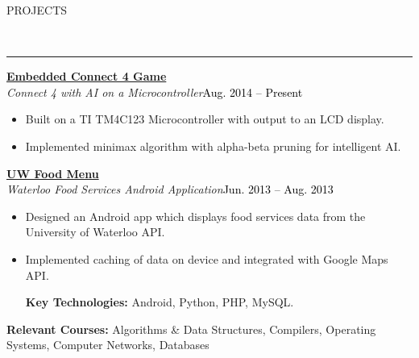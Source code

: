 \documentclass[11pt, letterpaper, oneside]{article}
\newcommand{\HRule}[2]{\textcolor{#1}{\rule{\linewidth}{#2}}}
\newcommand{\sectiontitle}[1]{\begin{minipage}{\textwidth}\vspace{-7.5pt}\begin{flushleft}\hspace{-20.5pt}\vspace{-25pt}
\Large\MakeUppercase{#1}\end{flushleft}\end{minipage}\\\HRule{black}{0.15mm}\vspace{\baselineskip}}
\newenvironment{ressection}[1]{
  \sectiontitle{#1}}
  {\vspace{-\baselineskip}}
\newcommand{\resentryheader}[4]{
    \vspace{-6pt}
    \textbf{#1}\hspace{\stretch{1}}\textcolor{black}{#3}\\
    \textit{#2}\hspace{\stretch{1}}\textcolor{black}{#4}\\
}
\newcommand{\resitem}[1]{
    \vspace{2pt}
    \item \begin{flushleft} #1 \end{flushleft}
}
\newenvironment{resentry}[4]{
  \begin{minipage}{\textwidth}
  \vspace{-3pt}
    \resentryheader{#1}{#2}{#3}{#4}
        \vspace{-\baselineskip}
    \begin{itemize}[noitemsep,nolistsep]
}{
    \end{itemize}
        \vspace{\baselineskip}
        \end{minipage}
}
\begin{document}
\begin{ressection}{Projects}
  \begin{resentry}{\href{https://github.com/coreywu/Connect4}{Embedded Connect 4 Game}}{Connect 4 with AI on a Microcontroller}{}{Aug. 2014 -- Present}
    \resitem{Built on a TI TM4C123 Microcontroller with output to an LCD display. }
    \resitem{Implemented minimax algorithm with alpha-beta pruning for intelligent AI.}
    \hspace{-15pt}
  \end{resentry}
  \begin{resentry}{\href{https://play.google.com/store/apps/details?id=ca.uwaterloo.uwfoodservices&hl=en}{UW Food Menu}}{Waterloo Food Services Android Application}{}{Jun. 2013 -- Aug. 2013}
    \resitem{Designed an Android app which displays food services data from the University of Waterloo API.}
    \resitem{Implemented caching of data on device and integrated with Google Maps API.}
    \vspace{2pt} \hspace{-15pt}
    \textbf{Key Technologies:} Android, Python, PHP, MySQL.
	\vspace{2pt}  
  \end{resentry}
  \textbf{Relevant Courses:} Algorithms \& Data Structures, Compilers, Operating Systems, Computer Networks, Databases
\end{ressection}
\end{document}
